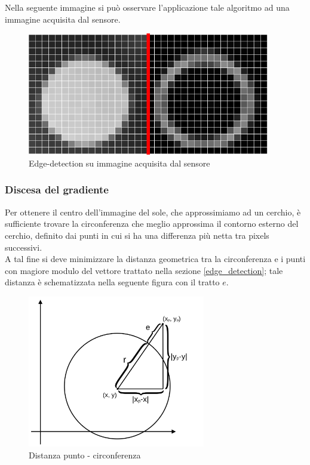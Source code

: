 \documentclass[12pt]{article}
\begin{document}
        
        Nella seguente immagine si può osservare l'applicazione tale algoritmo ad una immagine acquisita dal sensore.
        
        \begin{figure}[h]
        \centering
            \includegraphics[width=300pt]{Draws/default_image-gradient.png}
            \caption{Edge-detection su immagine acquisita dal sensore}
            \label{edge-detection_image_comparison}
        \end{figure}
        
        
        \subsubsection{Discesa del gradiente}
        Per ottenere il centro dell'immagine del sole, che approssimiamo ad un cerchio, è sufficiente trovare la circonferenza che meglio approssima il contorno esterno del cerchio, definito dai punti in cui si ha una differenza più netta tra pixels successivi. \\
        A tal fine si deve minimizzare la distanza geometrica tra la circonferenza e i punti con magiore modulo del vettore trattato nella sezione \ref{edge_detection}; tale distanza è schematizzata nella seguente figura con il tratto $ e $.

        \begin{figure}[h]
        \centering
            \includegraphics[width=220pt]{Draws/Discesa_del_gradiente_cerchio-punto.png}
            \caption{Distanza punto - circonferenza}
        \end{figure}
        
\end{document}
